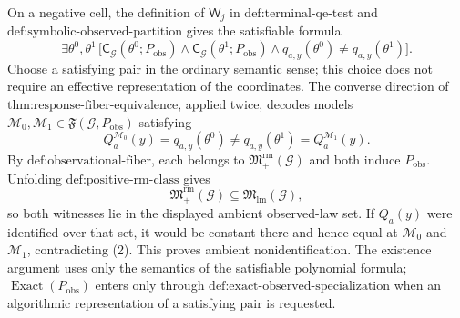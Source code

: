 On a negative cell, the definition of \(\mathsf W_j\) in \(\text{def:terminal-qe-test}\) and \(\text{def:symbolic-observed-partition}\) gives the satisfiable formula
\[
\exists\theta^0,\theta^1\,
\bigl[
\mathsf C_{\mathcal G}(\theta^0;P_{\mathrm{obs}})
\wedge\mathsf C_{\mathcal G}(\theta^1;P_{\mathrm{obs}})
\wedge q_{a,y}(\theta^0)\neq q_{a,y}(\theta^1)
\bigr].
\tag{1}
\]
Choose a satisfying pair in the ordinary semantic sense; this choice does not require an effective representation of the coordinates. The converse direction of \(\text{thm:response-fiber-equivalence}\), applied twice, decodes models \(\mathcal M_0,\mathcal M_1\in\mathfrak F(\mathcal G,P_{\mathrm{obs}})\) satisfying
\[
Q_a^{\mathcal M_0}(y)=q_{a,y}(\theta^0)
\neq q_{a,y}(\theta^1)=Q_a^{\mathcal M_1}(y).
\tag{2}
\]
By \(\text{def:observational-fiber}\), each belongs to \(\mathfrak M_{+}^{\mathrm{rm}}(\mathcal G)\) and both induce \(P_{\mathrm{obs}}\). Unfolding \(\text{def:positive-rm-class}\) gives
\[
\mathfrak M_{+}^{\mathrm{rm}}(\mathcal G)
\subseteq\mathfrak M_{\mathrm{lm}}(\mathcal G),
\tag{3}
\]
so both witnesses lie in the displayed ambient observed-law set. If \(Q_a(y)\) were identified over that set, it would be constant there and hence equal at \(\mathcal M_0\) and \(\mathcal M_1\), contradicting (2). This proves ambient nonidentification. The existence argument uses only the semantics of the satisfiable polynomial formula; \(\operatorname{Exact}(P_{\mathrm{obs}})\) enters only through \(\text{def:exact-observed-specialization}\) when an algorithmic representation of a satisfying pair is requested.